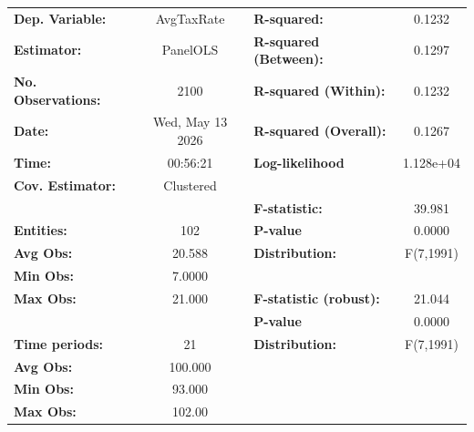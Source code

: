 \begin{center}
\begin{tabular}{lclc}
\toprule
\textbf{Dep. Variable:}                       &     AvgTaxRate     & \textbf{  R-squared:         }   &      0.1232      \\
\textbf{Estimator:}                           &      PanelOLS      & \textbf{  R-squared (Between):}  &      0.1297      \\
\textbf{No. Observations:}                    &        2100        & \textbf{  R-squared (Within):}   &      0.1232      \\
\textbf{Date:}                                &  Wed, May 13 2026  & \textbf{  R-squared (Overall):}  &      0.1267      \\
\textbf{Time:}                                &      00:56:21      & \textbf{  Log-likelihood     }   &    1.128e+04     \\
\textbf{Cov. Estimator:}                      &     Clustered      & \textbf{                     }   &                  \\
\textbf{}                                     &                    & \textbf{  F-statistic:       }   &      39.981      \\
\textbf{Entities:}                            &        102         & \textbf{  P-value            }   &      0.0000      \\
\textbf{Avg Obs:}                             &       20.588       & \textbf{  Distribution:      }   &    F(7,1991)     \\
\textbf{Min Obs:}                             &       7.0000       & \textbf{                     }   &                  \\
\textbf{Max Obs:}                             &       21.000       & \textbf{  F-statistic (robust):} &      21.044      \\
\textbf{}                                     &                    & \textbf{  P-value            }   &      0.0000      \\
\textbf{Time periods:}                        &         21         & \textbf{  Distribution:      }   &    F(7,1991)     \\
\textbf{Avg Obs:}                             &      100.000       & \textbf{                     }   &                  \\
\textbf{Min Obs:}                             &       93.000       & \textbf{                     }   &                  \\
\textbf{Max Obs:}                             &       102.00       & \textbf{                     }   &                  \\

\end{tabular}
\end{center}
